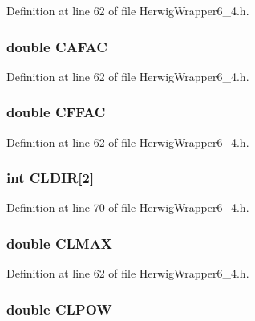 Definition at line 62 of file Herwig\-Wrapper6\_\-4.h.
\subsubsection{\setlength{\rightskip}{0pt plus 5cm}double {\bf CAFAC}}\label{HerwigWrapper6__4_8h_6a4765242f952ff5fb341bb5cd59e6f7}




Definition at line 62 of file Herwig\-Wrapper6\_\-4.h.
\subsubsection{\setlength{\rightskip}{0pt plus 5cm}double {\bf CFFAC}}\label{HerwigWrapper6__4_8h_2b1fb4dfe44ab59e9c6c692fb8c17702}




Definition at line 62 of file Herwig\-Wrapper6\_\-4.h.
\subsubsection{\setlength{\rightskip}{0pt plus 5cm}int {\bf CLDIR}[2]}\label{HerwigWrapper6__4_8h_8851561b8a7bc90a6e2b2815a41da8d2}




Definition at line 70 of file Herwig\-Wrapper6\_\-4.h.
\subsubsection{\setlength{\rightskip}{0pt plus 5cm}double {\bf CLMAX}}\label{HerwigWrapper6__4_8h_e172a5ea90a702989b5307b32cd45ffd}




Definition at line 62 of file Herwig\-Wrapper6\_\-4.h.
\subsubsection{\setlength{\rightskip}{0pt plus 5cm}double {\bf CLPOW}}\label{HerwigWrapper6__4_8h_03fd8f5d4088c2263db537cc4419b258}





